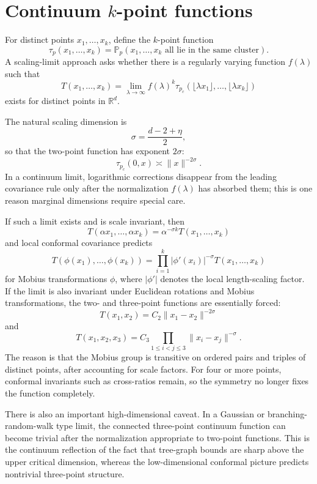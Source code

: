 \documentclass[11pt,reqno]{book}
\numberwithin{equation}{chapter}
\theoremstyle{plain}
\theoremstyle{definition}
\theoremstyle{remark}
\newcommand{\Pp}{\mathbb P_p}
\newcommand{\R}{\mathbb R}
\newcommand{\1}{\mathbf 1}
\newcommand{\norm}[1]{\lVert #1\rVert}
\newcommand{\as}{\asymp}
\begin{document}
\section[Continuum k-point functions]{Continuum \(k\)-point functions}

For distinct points $x_1,\ldots,x_k$, define the $k$-point function
\[
  \tau_p(x_1,\ldots,x_k)
  =
  \Pp(x_1,\ldots,x_k\text{ all lie in the same cluster}).
\]
A scaling-limit approach asks whether there is a regularly varying function $f(\lambda)$ such that
\[
  T(x_1,\ldots,x_k)
  =
  \lim_{\lambda\to\infty}
  f(\lambda)^k
  \tau_{p_c}(\lfloor \lambda x_1\rfloor,\ldots,\lfloor \lambda x_k\rfloor)
\]
exists for distinct points in $\R^d$.

The natural scaling dimension is
\[
  \sigma=\frac{d-2+\eta}{2},
\]
so that the two-point function has exponent $2\sigma$:
\[
  \tau_{p_c}(0,x)\as \norm{x}^{-2\sigma}.
\]
In a continuum limit, logarithmic corrections disappear from the leading covariance rule only after the normalization $f(\lambda)$ has absorbed them; this is one reason marginal dimensions require special care.

If such a limit exists and is scale invariant, then
\[
  T(\alpha x_1,\ldots,\alpha x_k)=\alpha^{-\sigma k}T(x_1,\ldots,x_k)
\]
and local conformal covariance predicts
\[
  T(\phi(x_1),\ldots,\phi(x_k))
  =
  \prod_{i=1}^k |\phi'(x_i)|^{-\sigma}
  T(x_1,\ldots,x_k)
\]
for Mobius transformations $\phi$, where $|\phi'|$ denotes the local length-scaling factor. If the limit is also invariant under Euclidean rotations and Mobius transformations, the two- and three-point functions are essentially forced:
\[
  T(x_1,x_2)=C_2\norm{x_1-x_2}^{-2\sigma}
\]
and
\[
  T(x_1,x_2,x_3)
  =
  C_3
  \prod_{1\leq i<j\leq 3}\norm{x_i-x_j}^{-\sigma}.
\]
The reason is that the Mobius group is transitive on ordered pairs and triples of distinct points, after accounting for scale factors. For four or more points, conformal invariants such as cross-ratios remain, so the symmetry no longer fixes the function completely.

There is also an important high-dimensional caveat. In a Gaussian or branching-random-walk type limit, the connected three-point continuum function can become trivial after the normalization appropriate to two-point functions. This is the continuum reflection of the fact that tree-graph bounds are sharp above the upper critical dimension, whereas the low-dimensional conformal picture predicts nontrivial three-point structure.
\end{document}
